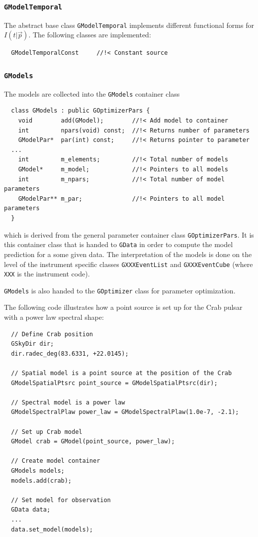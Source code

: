 \documentclass{article}[12pt,a4]
\begin{document}
\subsubsection{{\tt GModelTemporal}}

The abstract base class {\tt GModelTemporal} implements different functional forms for 
$I(t | \vec{p})$.
The following classes are implemented:
\begin{verbatim}
  GModelTemporalConst     //!< Constant source
\end{verbatim}


\subsubsection{{\tt GModels}}

The models are collected into the {\tt GModels} container class
\begin{verbatim}
  class GModels : public GOptimizerPars {
    void        add(GModel);        //!< Add model to container
    int         npars(void) const;  //!< Returns number of parameters
    GModelPar*  par(int) const;     //!< Returns pointer to parameter
  ...
    int         m_elements;         //!< Total number of models
    GModel*     m_model;            //!< Pointers to all models
    int         m_npars;            //!< Total number of model parameters
    GModelPar** m_par;              //!< Pointers to all model parameters
  }
\end{verbatim}
which is derived from the general parameter container class {\tt GOptimizerPars}.
It is this container class that is handed to {\tt GData} in order to compute the model
prediction for a some given data.
The interpretation of the models is done on the level of the instrument specific classes
{\tt GXXXEventList} and {\tt GXXXEventCube} (where {\tt XXX} is the instrument code).

{\tt GModels} is also handed to the {\tt GOptimizer} class for parameter optimization.

The following code illustrates how a point source is set up for the Crab pulsar with a
power law spectral shape:
\begin{verbatim}
  // Define Crab position
  GSkyDir dir;
  dir.radec_deg(83.6331, +22.0145);
  
  // Spatial model is a point source at the position of the Crab
  GModelSpatialPtsrc point_source = GModelSpatialPtsrc(dir);
  
  // Spectral model is a power law
  GModelSpectralPlaw power_law = GModelSpectralPlaw(1.0e-7, -2.1);
  
  // Set up Crab model
  GModel crab = GModel(point_source, power_law);
  
  // Create model container
  GModels models;
  models.add(crab);
  
  // Set model for observation
  GData data;
  ...
  data.set_model(models);
\end{verbatim}
\end{document}
